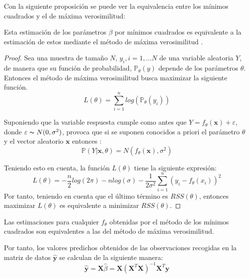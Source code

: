 \noindent Con la siguiente proposición se puede ver la equivalencia entre los mínimos cuadrados y el de máxima verosimilitud:

\begin{propo}
Esta estimación de los parámetros $\beta$ por mínimos cuadrados es equivalente a la estimación de estos mediante el método de máxima verosimilitud \cite{Hastie 2001}.
\begin{proof}
Sea una muestra de tamaño $N$, $y_i, i=1,\ldots N$ de una variable aleatoria $Y$, de manera que su función de probabilidad, $\mathbb{P}_\theta(y)$ depende de los parámetros $\theta$. Entonces el método de máxima verosimilitud busca maximizar la siguiente función.
\begin{equation}
L(\theta)=\sum_{i=1}^n log( \mathbb{P}_{\theta}(y_i))
\end{equation}

\noindent Suponiendo que la variable respuesta cumple como antes que  $Y=f_\theta (\textbf{x})+\varepsilon$, donde $\varepsilon \thicksim N(0,\sigma^2)$, provoca que si se suponen conocidos a priori el parámetro $\theta$ y el vector aleatorio $\textbf{x}$ entonces :
\begin{equation}
\mathbb{P}(Y|\textbf{x},\theta)=N(f_\theta(\textbf{x}), \sigma^2)
\end{equation}

\noindent Teniendo esto en cuenta, la función $L(\theta)$ tiene la siguiente expresión:
\begin{equation}
L(\theta)=-\dfrac{n}{2}log(2\pi)-n log(\sigma)-\dfrac{1}{2\sigma^2}\sum_{i=1}^n (y_i-f_\theta (x_i))^2
\end{equation}
Por tanto, teniendo en cuenta que el último término es $RSS(\theta)$, entonces maximizar $L(\theta)$ es equivalente a minimizar $RSS(\theta)$.
\end{proof}
\end{propo}
\begin{coro}
Las estimaciones para cualquier $f_{\theta}$ obtenidas por el método de los mínimos cuadrados son equivalentes a las del método de máxima verosimilitud.  
\end{coro}
\noindent Por tanto, los valores predichos obtenidos de las observaciones recogidas en la matriz de datos $\hat{\textbf{y}}$ se calculan de la siguiente manera:
\begin{equation}
\hat{\textbf{y}}=\textbf{X}\hat{\beta}=\textbf{X}(\textbf{X}^T\textbf{X})^{-1}\textbf{X}^T\textbf{y}
\end{equation}

